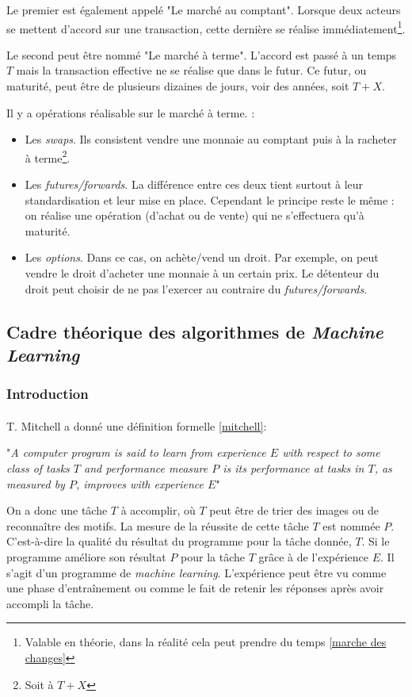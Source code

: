 \documentclass[a4paper, 11pt]{article}
\begin{document}
Le premier est également appelé "Le marché au comptant". Lorsque deux acteurs se mettent d'accord sur une transaction, cette dernière se réalise immédiatement\footnote{Valable en théorie, dans la réalité cela peut prendre du temps \ref{marche des changes}}.

Le second peut être nommé "Le marché à terme". L'accord est passé à un temps $T$ mais la transaction effective ne se réalise que dans le futur. Ce futur, ou maturité, peut être de plusieurs dizaines de jours, voir des années, soit $T + X$.

Il y a opérations réalisable sur le marché à terme. :
\begin{itemize}
\item Les \textit{swaps}. Ils consistent vendre une monnaie au comptant puis à la racheter à terme\footnote{Soit à $T+X$}.
\item Les \textit{futures/forwards}. La différence entre ces deux tient surtout à leur standardisation et leur mise en place. Cependant le principe reste le même : on réalise une opération (d'achat ou de vente) qui ne s'effectuera qu'à maturité.
\item Les \textit{options}. Dans ce cas, on achète/vend un droit. Par exemple, on peut vendre le droit d'acheter une monnaie à un certain prix. Le détenteur du droit peut choisir de ne pas l'exercer au contraire du \textit{futures/forwards}.
\end{itemize}


\subsection{Cadre théorique des algorithmes de \textit{Machine Learning}}
\subsubsection{Introduction}
\paragraph{}
T. Mitchell a donné une définition formelle \ref{mitchell}:
\begin{center}
"\textit{A computer program is said to learn from experience $E$ with respect to some class of tasks $T$ and performance measure $P$ is its performance at tasks in $T$, as measured by $P$, improves with experience $E$}"
\end{center}

On a donc une tâche $T$ à accomplir, où $T$ peut être de trier des images ou de reconnaître des motifs. La mesure de la réussite de cette tâche $T$ est nommée $P$. C'est-à-dire la qualité du résultat du programme pour la tâche donnée, $T$. Si le programme améliore son résultat $P$ pour la tâche $T$ grâce à de l'expérience $E$. Il s'agit d'un programme de \textit{machine learning}. L'expérience peut être vu comme une phase d'entraînement ou comme le fait de retenir les réponses après avoir accompli la tâche.
\end{document}
